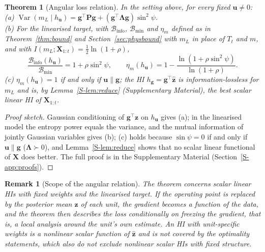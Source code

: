 \documentclass[preprint,12pt]{elsarticle}
\newtheorem{theorem}{Theorem}
\newtheorem{remark}{Remark}
\theoremstyle{definition}
\newcommand{\Binfo}{\mathcal{B}_{\mathrm{info}}}
\DeclareMathOperator{\Var}{Var}
\begin{document}
\begin{theorem}[Angular loss relation]
\label{thm:angular}
In the setting above, for every fixed $\mathbf u\ne0$:\\
(a) $\Var(m_L\mid h_{\mathbf u})=\mathbf g^\top\mathbf P\mathbf g+(\mathbf g^\top\boldsymbol\Lambda\mathbf g)\sin^2\psi$.\\
(b) For the linearised target, with $\Binfo$, $\mathcal B_{\min}$ and $\eta_m$ defined as in Theorem~\ref{thm:bound} and Section~\ref{sec:physbound} with $m_L$ in place of $T_t$ and $m$, and with $I(m_L;\mathbf{X}_{1:t})=\tfrac12\ln(1+\rho)$,
\begin{equation}
\frac{\Binfo(h_{\mathbf u})}{\mathcal B_{\min}}=1+\rho\sin^2\psi,\qquad \eta_m(h_{\mathbf u})=1-\frac{\ln(1+\rho\sin^2\psi)}{\ln(1+\rho)} .
\end{equation}
(c) $\eta_m(h_{\mathbf u})=1$ if and only if $\mathbf u\parallel\mathbf g$; the HI $h_{\mathbf g}=\mathbf g^\top\hat{\mathbf z}$ is information-lossless for $m_L$ and is, by Lemma~\ref{S-lem:reduce} (Supplementary Material), the best scalar linear HI of $\mathbf{X}_{1:t}$.
\end{theorem}
\begin{proof}[Proof sketch]
Gaussian conditioning of $\mathbf g^\top\mathbf z$ on $h_{\mathbf u}$ gives (a); in the linearised model the entropy power equals the variance, and the mutual information of jointly Gaussian variables gives (b); (c) holds because $\sin\psi=0$ if and only if $\mathbf u\parallel\mathbf g$ ($\boldsymbol\Lambda\succ0$), and Lemma~\ref{S-lem:reduce} shows that no scalar linear functional of $\mathbf X$ does better. The full proof is in the Supplementary Material (Section~\ref{S-app:proofs}).
\end{proof}

\begin{remark}[Scope of the angular relation]
\label{rem:scope}
The theorem concerns scalar \emph{linear} HIs with fixed weights and the linearised target. If the operating point is replaced by the posterior mean $\hat{\mathbf z}$ of each unit, the gradient becomes a function of the data, and the theorem then describes the loss conditionally on freezing the gradient, that is, a local analysis around the unit's own estimate. An HI with unit-specific weights is a nonlinear scalar function of $\hat{\mathbf z}$ and is not covered by the optimality statements, which also do not exclude nonlinear scalar HIs with fixed structure.
\end{remark}
\end{document}

